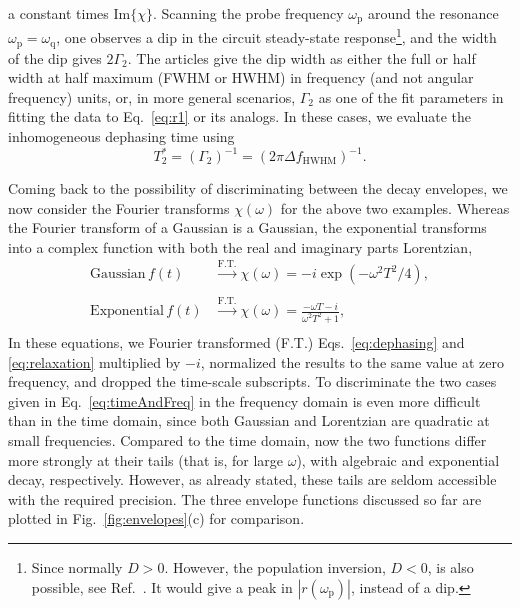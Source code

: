 \documentclass[aps, prx, showpacs, twocolumn, superscriptaddress, notitlepage, longbibliography, floatfix, nofootinbib]{revtex4-2}
\begin{document}
a constant times $\mathrm{Im}\{\chi\}$. 
Scanning the probe frequency $\omega_\mathrm{p}$ around the resonance $\omega_\mathrm{p}=\omega_\mathrm{q}$, one observes a dip in the circuit steady-state response\footnote{Since normally $D>0$. However, the population inversion, $D<0$, is also possible, see Ref.~\cite{hauss_single-qubit_2008}. It would give a peak in $|r(\omega_\mathrm{p})|$, instead of a dip.}, and the width of the dip gives $2\Gamma_2$. The articles give the dip width as either the full or half width at half maximum (FWHM or HWHM) in frequency (and not angular frequency) units, or, in more general scenarios, $\Gamma_2$ as one of the fit parameters in fitting the data to Eq.~\eqref{eq:r1} or its analogs. In these cases, we evaluate the inhomogeneous dephasing time using
\begin{equation}
T_2^* = (\Gamma_2)^{-1}= \left( 2 \pi \Delta\! f_\mathrm{HWHM} \right)^{-1}.
\label{eq:HWHM}
\end{equation}



Coming back to the possibility of discriminating between the decay envelopes, we now consider the Fourier transforms $\chi(\omega)$ for the above two examples. Whereas the Fourier transform of a Gaussian is a Gaussian, the exponential transforms into a complex function with both the real and imaginary parts Lorentzian,
\begin{subequations}
\begin{align}
\textrm{Gaussian}\,f(t) &\overset{\mathrm{F.T.}}{\to}  \chi(\omega) = -i \exp( - \omega^2 T^2/4),\\
\nonumber\\
\textrm{Exponential}\,f(t) &\overset{\mathrm{F.T.}}{\to}   \chi(\omega) = \frac{- \omega T-i}{\omega^2 T^2 + 1},\\
\nonumber
\end{align}
\label{eq:timeAndFreq}
\end{subequations}
In  these equations, we Fourier transformed (F.T.) Eqs.~\eqref{eq:dephasing} and \eqref{eq:relaxation} multiplied by $-i$, normalized the results to the same value at zero frequency, and dropped the time-scale subscripts. To discriminate the two cases given in Eq.~\eqref{eq:timeAndFreq} in the frequency domain is even more difficult than in the time domain, since both Gaussian and Lorentzian are quadratic at small frequencies. Compared to the time domain, now the two functions differ more strongly at their tails (that is, for large $\omega$), with algebraic and exponential decay, respectively. However, as already stated, these tails are seldom accessible with the required precision. The three envelope functions discussed so far are plotted in Fig.~\ref{fig:envelopes}(c) for comparison.
\end{document}

